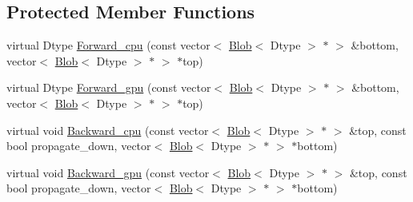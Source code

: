 \subsection*{Protected Member Functions}
\begin{DoxyCompactItemize}
\item 
virtual Dtype \hyperlink{classcaffe_1_1_pooling_layer_a94e0eecfd992d045bd0b8b0cee4523f0}{Forward\+\_\+cpu} (const vector$<$ \hyperlink{classcaffe_1_1_blob}{Blob}$<$ Dtype $>$ $\ast$ $>$ \&bottom, vector$<$ \hyperlink{classcaffe_1_1_blob}{Blob}$<$ Dtype $>$ $\ast$ $>$ $\ast$top)
\item 
virtual Dtype \hyperlink{classcaffe_1_1_pooling_layer_a6997ba2f8adca32e201b2e3aa5271791}{Forward\+\_\+gpu} (const vector$<$ \hyperlink{classcaffe_1_1_blob}{Blob}$<$ Dtype $>$ $\ast$ $>$ \&bottom, vector$<$ \hyperlink{classcaffe_1_1_blob}{Blob}$<$ Dtype $>$ $\ast$ $>$ $\ast$top)
\item 
virtual void \hyperlink{classcaffe_1_1_pooling_layer_aad07e6ab8b23155a971e2e78e87f0763}{Backward\+\_\+cpu} (const vector$<$ \hyperlink{classcaffe_1_1_blob}{Blob}$<$ Dtype $>$ $\ast$ $>$ \&top, const bool propagate\+\_\+down, vector$<$ \hyperlink{classcaffe_1_1_blob}{Blob}$<$ Dtype $>$ $\ast$ $>$ $\ast$bottom)
\item 
virtual void \hyperlink{classcaffe_1_1_pooling_layer_a90db5feba107ee64fb1c3cfacc0b2f38}{Backward\+\_\+gpu} (const vector$<$ \hyperlink{classcaffe_1_1_blob}{Blob}$<$ Dtype $>$ $\ast$ $>$ \&top, const bool propagate\+\_\+down, vector$<$ \hyperlink{classcaffe_1_1_blob}{Blob}$<$ Dtype $>$ $\ast$ $>$ $\ast$bottom)
\end{DoxyCompactItemize}
